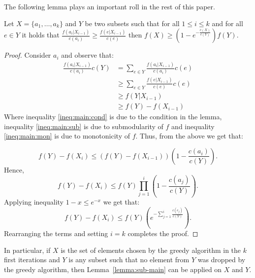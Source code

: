 The following lemma plays an important roll in the rest of this paper.

\begin{lemma}
\label{lemma:sub-main}
Let $X = \{a_1, \dots, a_k\}$ and $Y$ be two subsets such that for all $1 \leq i \leq k$ 
and for all $e \in Y$ it holds that 
$\frac{f(a_i|X_{i-1})}{c(a_i)} \geq \frac{f(e|X_{i-1})}{c(e)}$
then $f(X) \geq (1 - e^{-\frac{c(X)}{c(Y)}})f(Y)$.
\end{lemma} 

\begin{proof}
Consider $a_i$ and observe that:
\begin{align}
	\frac{f(a_i|X_{i-1})}{c(a_i)}c(Y) 
	& = \sum_{e \in Y} \frac{f(a_i|X_{i-1})}{c(a_i)}c(e)
	\nonumber
	\\ 	& \geq \sum_{e \in Y} \frac{f(e|X_{i-1})}{c(e)}c(e)
	\label{ineq:main:cond}
	\\	& \geq f(Y|X_{i-1})
	\label{ineq:main:sub}
	\\ 	& \geq f(Y) - f(X_{i-1})
	\label{ineq:main:mon}
\end{align}
Where inequality \ref{ineq:main:cond} is due to the condition in the lemma, inequality \ref{ineq:main:sub} is due to submodularity of $f$ and inequality \ref{ineq:main:mon} is due to monotonicity of $f$.
Thus, from the above we get that:

$$
f(Y) - f(X_i)  \leq (f(Y) - f(X_{i - 1}))
\left(1 - \frac{c(a_i)}{c(Y)}\right).
$$
Hence,
$$
f(Y) - f(X_i)  \leq f(Y) \prod_{j = 1}^{i}
\left(1 - \frac{c(a_j)}{c(Y)}\right).
$$
Applying inequality $1 - x \leq e^{-x}$ we get that:
$$
f(Y) - f(X_i)  \leq f(Y) 
\left(e^{-\sum_{j = 1}^{i}\frac{c(e_j)}{c(Y)}}\right).
$$
Rearranging the terms and setting $i = k$ completes the proof.
\end{proof}

In particular, if $X$ is the set of elements chosen by the greedy algorithm in 
the $k$ first iterations and $Y$ is any subset such that no element from $Y$ was dropped
by the greedy algorithm, 
then Lemma~\ref{lemma:sub-main} can be applied on $X$ and $Y$.   





